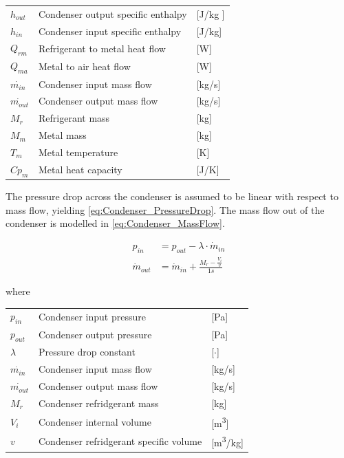 \begin{center}
	\begin{tabular}{l p{8cm} l}
		$h_{out}$				&  Condenser output specific enthalpy			& [\si{J}/\si{kg} ]\\
		$h_{in}$					&  Condenser input specific enthalpy 			& [\si{J}/\si{kg}] \\
		$Q_{rm}$					& Refrigerant to metal heat flow 			& [\si{W}] \\
		$Q_{ma}$					& Metal to air heat flow						& [\si{W}] \\
		$\dot{m_{in}}$			& Condenser input mass flow 			& [\si{kg}/\si{s}] \\
		$\dot{m_{out}}$			& Condenser output mass flow 		& [\si{kg}/\si{s}] \\
		$M_r$						& Refrigerant mass 								& [\si{kg}] \\
		$M_m$						& Metal mass												& [\si{kg}] \\
		$T_m$						& Metal temperature 							& [\si{K}]\\
		$Cp_m$					& Metal heat capacity 						& [\si{J}/\si{K}]\\
	\end{tabular}
\end{center}

The pressure drop across the condenser is assumed to be linear with respect to mass flow, yielding \cref{eq:Condenser_PressureDrop}.
The mass flow out of the condenser is modelled in \cref{eq:Condenser_MassFlow}.


\begin{align}
	p_{in} 	& =  p_{out} - \lambda \cdot \dot{m}_{in}  				\label{eq:Condenser_PressureDrop}\\
	\dot{m}_{out}		& = \dot{m}_{in} + \frac{M_r - \frac{V_i}{v}}{1s}		\label{eq:Condenser_MassFlow}
\end{align}

where

\begin{center}
	\begin{tabular}{l p{8cm} l}
		$p_{in}$				&	Condenser input pressure					& [\si{Pa}] \\
		$p_{out}$				&	Condenser output pressure					& [\si{Pa}] \\
		$\lambda$				& 	Pressure drop constant	 					& [$\cdot$] \\
		$\dot{m_{in}}$			& 	Condenser input mass flow 					& [\si{kg}/\si{s}] \\
		$\dot{m_{out}}$			& 	Condenser output mass flow 					& [\si{kg}/\si{s}] \\
		$M_{r}$					&	Condenser refridgerant mass					& [\si{kg}] \\
		$V_{i}$					&	Condenser internal volume					& [\si{m^3}] \\
		$v$						&	Condenser refridgerant specific volume		& [\si{m^3}/\si{kg}] \\
	\end{tabular}
\end{center}


